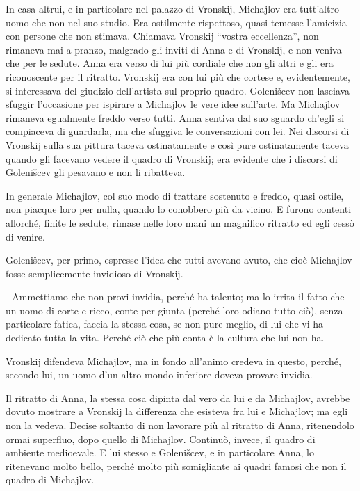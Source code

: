 In casa altrui, e in particolare nel palazzo di Vronskij, Michajlov era tutt'altro uomo che non nel suo studio. Era ostilmente rispettoso, quasi temesse l'amicizia con persone che non stimava. Chiamava Vronskij ``vostra eccellenza'', non rimaneva mai a pranzo, malgrado gli inviti di Anna e di Vronskij, e non veniva che per le sedute. Anna era verso di lui più cordiale che non gli altri e gli era riconoscente per il ritratto. Vronskij era con lui più che cortese e, evidentemente, si interessava del giudizio dell'artista sul proprio quadro. Golenišcev non lasciava sfuggir l'occasione per ispirare a Michajlov le vere idee sull'arte. Ma Michajlov rimaneva egualmente freddo verso tutti. Anna sentiva dal suo sguardo ch'egli si compiaceva di guardarla, ma che sfuggiva le conversazioni con lei. Nei discorsi di Vronskij sulla sua pittura taceva ostinatamente e così pure ostinatamente taceva quando gli facevano vedere il quadro di Vronskij; era evidente che i discorsi di Golenišcev gli pesavano e non li ribatteva. 

In generale Michajlov, col suo modo di trattare sostenuto e freddo, quasi ostile, non piacque loro per nulla, quando lo conobbero più da vicino. E furono contenti allorché, finite le sedute, rimase nelle loro mani un magnifico ritratto ed egli cessò di venire. 

Golenišcev, per primo, espresse l'idea che tutti avevano avuto, che cioè Michajlov fosse semplicemente invidioso di Vronskij. 

- Ammettiamo che non provi invidia, perché ha talento; ma lo irrita il fatto che un uomo di corte e ricco, conte per giunta (perché loro odiano tutto ciò), senza particolare fatica, faccia la stessa cosa, se non pure meglio, di lui che vi ha dedicato tutta la vita. Perché ciò che più conta è la cultura che lui non ha. 

Vronskij difendeva Michajlov, ma in fondo all'animo credeva in questo, perché, secondo lui, un uomo d'un altro mondo inferiore doveva provare invidia. 

Il ritratto di Anna, la stessa cosa dipinta dal vero da lui e da Michajlov, avrebbe dovuto mostrare a Vronskij la differenza che esisteva fra lui e Michajlov; ma egli non la vedeva. Decise soltanto di non lavorare più al ritratto di Anna, ritenendolo ormai superfluo, dopo quello di Michajlov. Continuò, invece, il quadro di ambiente medioevale. E lui stesso e Golenišcev, e in particolare Anna, lo ritenevano molto bello, perché molto più somigliante ai quadri famosi che non il quadro di Michajlov. 

